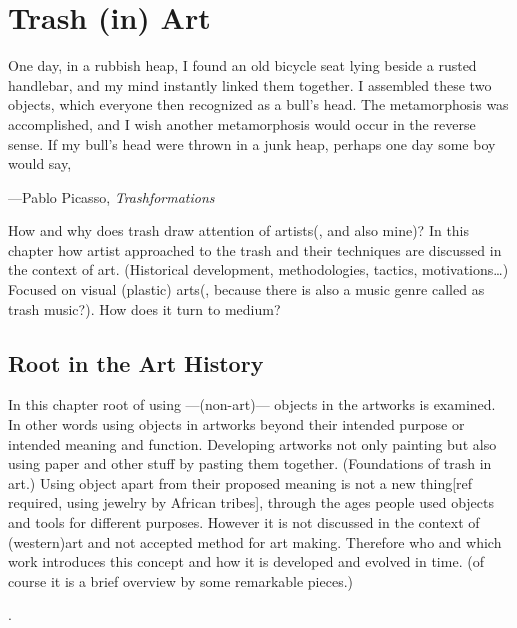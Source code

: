 \chapter{Trash (in) Art}

\epigraph{One day, in a rubbish heap, I found an old bicycle seat lying beside a rusted handlebar, and my mind instantly linked them together. I assembled these two objects, which everyone then recognized as a bull’s head. The metamorphosis was accomplished, and I wish another metamorphosis would occur in the reverse sense. If my bull’s head were thrown in a junk heap, perhaps one day some boy would say, }{\hfill ---Pablo Picasso, \textit{Trashformations}}

How and why does trash draw attention of artists(, and also mine)? In this chapter how artist approached to the trash and their techniques are discussed in the context of art. (Historical development, methodologies, tactics, motivations\ldots) Focused on visual (plastic) arts(, because there is also a music genre called as trash music?). How does it turn to medium?


\section{Root in the Art History}
In this chapter root of using ---(non-art)--- objects in the artworks is examined. In other words using objects in artworks beyond their intended purpose or intended meaning and function. Developing artworks not only painting but also using paper and other stuff by pasting them together. (Foundations of trash in art.) Using object apart from their proposed meaning is not a new thing[ref required, using jewelry by African tribes], through the ages people used objects and tools for different purposes. However it is not discussed in the context of (western)art and not accepted method for art making. Therefore who and which work introduces this concept and how it is developed and evolved in time. (of course it is a brief overview by some remarkable pieces.)

  \cite{tauxe2012encyclopedia}.

